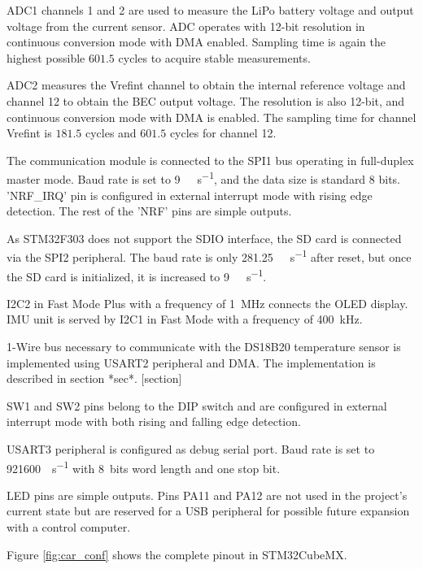 ADC1 channels 1 and 2 are used to measure the LiPo battery voltage and output voltage from the current sensor. ADC operates with 12-bit resolution in continuous conversion mode with DMA enabled. Sampling time is again the highest possible $601.5$ cycles to acquire stable measurements.

ADC2 measures the Vrefint channel to obtain the internal reference voltage and channel 12 to obtain the BEC output voltage. The resolution is also 12-bit, and continuous conversion mode with DMA is enabled. The sampling time for channel Vrefint is $181.5$ cycles and $601.5$ cycles for channel 12.

The communication module is connected to the SPI1 bus operating in full-duplex master mode. Baud rate is set to \SI{9}{\mega\bit\per\second}, and the data size is standard 8 bits. 'NRF\_IRQ' pin is configured in external interrupt mode with rising edge detection. The rest of the 'NRF' pins are simple outputs.

As STM32F303 does not support the SDIO interface, the SD card is connected via the SPI2 peripheral. The baud rate is only \SI{281.25}{\kilo\bit\per\second} after reset, but once the SD card is initialized, it is increased to \SI{9}{\mega\bit\per\second}.

I2C2 in Fast Mode Plus with a frequency of \SI{1}{\MHz} connects the OLED display. IMU unit is served by I2C1 in Fast Mode with a frequency of \SI{400}{\kHz}.

1-Wire bus necessary to communicate with the DS18B20 temperature sensor is implemented using USART2 peripheral and DMA. The implementation is described in section *sec*. [\todo section]

SW1 and SW2 pins belong to the DIP switch and are configured in external interrupt mode with both rising and falling edge detection.

USART3 peripheral is configured as debug serial port. Baud rate is set to \SI{921600}{\bit\per\second} with 8~bits word length and one stop bit.

LED pins are simple outputs. Pins PA11 and PA12 are not used in the project's current state but are reserved for a USB peripheral for possible future expansion with a control computer.

Figure \ref{fig:car_conf} shows the complete pinout in STM32CubeMX.